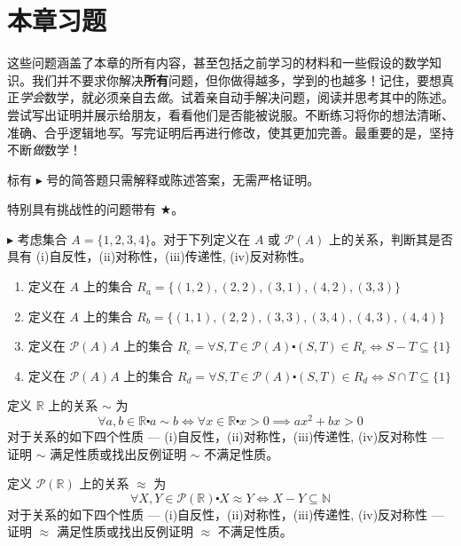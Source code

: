 \section{本章习题}

这些问题涵盖了本章的所有内容，甚至包括之前学习的材料和一些假设的数学知识。我们并不要求你解决\textbf{所有}问题，但你做得越多，学到的也越多！记住，要想真正\emph{学会}数学，就必须亲自去\emph{做}。试着亲自动手解决问题，阅读并思考其中的陈述。尝试写出证明并展示给朋友，看看他们是否能被说服。不断练习将你的想法清晰、准确、合乎逻辑地\emph{写}。写完证明后再进行修改，使其更加完善。最重要的是，坚持不断\emph{做}数学！

标有 $\blacktriangleright$ 号的简答题只需解释或陈述答案，无需严格证明。

特别具有挑战性的问题带有 $\bigstar$。\\

\begin{exercise}
    $\blacktriangleright$ 考虑集合 $A = \{1, 2, 3, 4\}$。对于下列定义在 $A$ 或 $\mathcal{P}(A)$ 上的关系，判断其是否具有 (i)自反性，(ii)对称性，(iii)传递性, (iv)反对称性。
    \begin{enumerate}[label=(\alph*)]
        \item 定义在 $A$ 上的集合 $R_a= \{ (1, 2),(2, 2),(3, 1),(4, 2),(3, 3) \}$
        \item 定义在 $A$ 上的集合 $R_b= \{  (1, 1),(2, 2),(3, 3),(3, 4),(4, 3),(4, 4) \}$
        \item 定义在 $\mathcal{P}(A)A$ 上的集合 $R_c= \forall S, T \in \mathcal{P}(A) \centerdot (S, T) \in R_c \iff S - T \subseteq \{1\}$
        \item 定义在 $\mathcal{P}(A)A$ 上的集合 $R_d= \forall S, T \in \mathcal{P}(A) \centerdot (S, T) \in R_d \iff S \cap T \subseteq \{1\}$
    \end{enumerate}
\end{exercise}

\begin{exercise}
    定义 $\mathbb{R}$ 上的关系 $\sim$ 为
    \[\forall a, b \in \mathbb{R} \centerdot a \sim b \iff  \forall x \in \mathbb{R} \centerdot x > 0 \implies ax^2 + bx > 0\]
    对于关系的如下四个性质 --- (i)自反性，(ii)对称性，(iii)传递性, (iv)反对称性 --- 证明 $\sim$ 满足性质或找出反例证明 $\sim$ 不满足性质。
\end{exercise}

\begin{exercise}
    定义 $\mathcal{P}(\mathbb{R})$ 上的关系 $\approx$ 为
    \[\forall X, Y \in \mathcal{P}(\mathbb{R}) \centerdot X \approx Y \iff X - Y \subseteq \mathbb{N}\]
    对于关系的如下四个性质 --- (i)自反性，(ii)对称性，(iii)传递性, (iv)反对称性 --- 证明 $\approx$ 满足性质或找出反例证明 $\approx$ 不满足性质。
\end{exercise}

